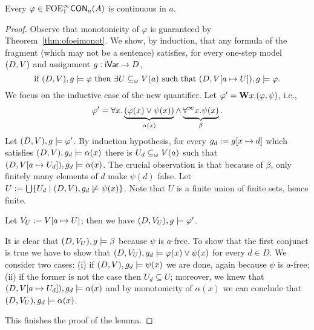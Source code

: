\begin{lemma}\label{lem:cofoeiiscont}
Every $\varphi \in \mathrm{FOE}^{\infty}_1\mathsf{CON}_{a}(A)$ is continuous in $a$.
\end{lemma}
\begin{proof}
Observe that monotonicity of $\varphi$ is guaranteed by Theorem~\ref{thm:ofoeimonot}.
We show, by induction, that any formula of the fragment (which may not be a sentence) satisfies, for every one-step model $(D,V)$ and assignment ${g:\mathsf{iVar}\to D}$,
%
\[
\text{if } (D,\val),\ass \models \varphi \text{ then } \exists U \subseteq_\omega \val(a) \text{ such that } (D,\val[a\mapsto U]),\ass \models \varphi.
\]
%
We focus on the inductive case of the new quantifier. Let $\varphi' = \mathbf{W} x.(\varphi,\psi)$, i.e., %
%
\[\varphi' = \forall x.\underbrace{(\varphi(x) \lor \psi(x))}_{\alpha(x)} \land \underbrace{\forall^\infty x.\psi(x)}_\beta.\]
%
Let $(D,V),g \models \varphi'$. By induction hypothesis,
for every $g_d := g[x\mapsto d]$ which satisfies $(D,V),g_d \models \alpha(x)$ there is $U_d \subseteq_\omega V(a)$ such that $(D,V[a\mapsto U_d]),g_d \models \alpha(x)$. The crucial observation is that because of $\beta$, %
only finitely many elements of $d$ make $\psi(d)$ false. Let $U := \bigcup \{U_d \mid (D,V), g_d \not\models \psi(x) \}$. Note that $U$ is a finite union of finite sets, hence finite.
%
\begin{claimfirst}
	Let $V_U := V[a\mapsto U]$; then we have $(D,V_U),g \models \varphi'$.
\end{claimfirst}
%
\begin{pfclaim}
	It is clear that $(D,V_U),g \models \beta$ because $\psi$ is $a$-free. To show that the first conjunct is true we have to show that $(D,V_U),g_d \models \varphi(x) \lor \psi(x)$ for every $d\in D$. We consider two cases: (i) if $(D,V),g_d \models \psi(x)$ we are done, again because $\psi$ is $a$-free; (ii) if the former is not the case then $U_d \subseteq U$; moreover, we knew that $(D,V[a\mapsto U_d]),g_d \models \alpha(x)$ and by monotonicity of $\alpha(x)$ we can conclude that $(D,V_U),g_d \models \alpha(x)$.
\end{pfclaim}
%
This finishes the proof of the lemma.
\end{proof}



